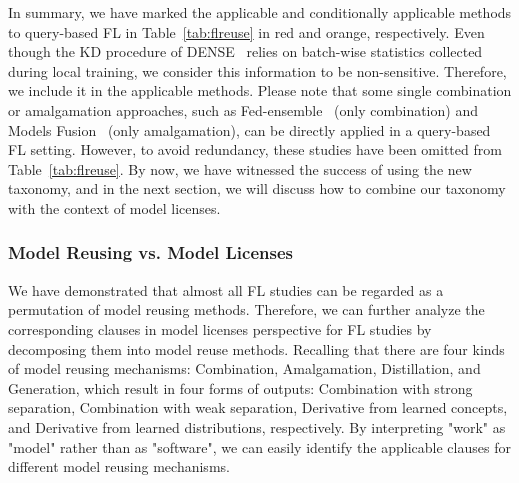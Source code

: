
In summary, we have marked the applicable and conditionally applicable methods to query-based FL in Table~\ref{tab:flreuse} in red and orange, respectively.
Even though the KD procedure of DENSE~\cite{zhang2022dense} relies on batch-wise statistics collected during local training, we consider this information to be non-sensitive. 
Therefore, we include it in the applicable methods.
Please note that some single combination or amalgamation approaches, such as Fed-ensemble~\cite{shi2023fed} (only combination) and Models Fusion~\cite{yurochkin2019bayesian, yurochkin2019statistical, lam2021model} (only amalgamation), can be directly applied in a query-based FL setting. 
However, to avoid redundancy, these studies have been omitted from Table~\ref{tab:flreuse}.
By now, we have witnessed the success of using the new taxonomy, and in the next section, we will discuss how to combine our taxonomy with the context of model licenses.


\subsubsection{Model Reusing vs. Model Licenses}
\label{sec:reusing&license}
We have demonstrated that almost all FL studies can be regarded as a permutation of model reusing methods. 
Therefore, we can further analyze the corresponding clauses in model licenses perspective for FL studies by decomposing them into model reuse methods.
Recalling that there are four kinds of model reusing mechanisms: Combination, Amalgamation, Distillation, and Generation, which result in four forms of outputs: Combination with strong separation, Combination with weak separation, Derivative from learned concepts, and Derivative from learned distributions, respectively.
By interpreting "work" as "model" rather than as "software", we can easily identify the applicable clauses for different model reusing mechanisms.

